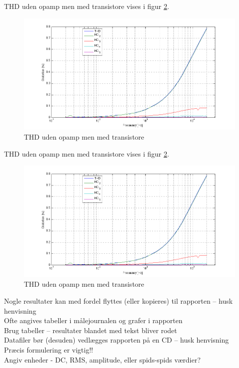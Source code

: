 THD uden opamp men med transistore vises i figur \ref{fig:apind:uopmt}.
\begin{figure}[h]
\centering
\includegraphics[width=\textwidth]{maalerapporter/indgangsvaelger/maalinger/2. gang/ingen opamp 2V med transistor thd.png}
\caption{THD uden opamp men med transistore}
\label{fig:apind:uopmt}
\end{figure}

THD uden opamp men med transistore vises i figur \ref{fig:apind:uopmt}.
\begin{figure}[h]
\centering
\includegraphics[width=\textwidth]{maalerapporter/indgangsvaelger/maalinger/2. gang/ingen opamp 2V med transistor thd.png}
\caption{THD uden opamp men med transistore}
\label{fig:apind:uopmt}
\end{figure}



Nogle resultater kan med fordel flyttes (eller kopieres) til rapporten – husk henvisning \\
Ofte angives tabeller i målejournalen og grafer i rapporten \\
Brug tabeller – resultater blandet med tekst bliver rodet\\
Datafiler bør (desuden) vedlægges rapporten på en CD – husk henvisning\\
Præcis formulering er vigtig!!\\
Angiv enheder - DC, RMS, amplitude, eller spids-spids værdier?\\

